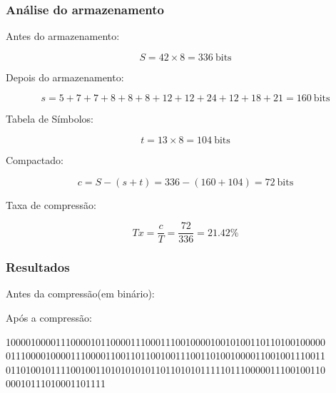 \documentclass[10pt]{beamer}
\begin{document}
\begin{frame}[t]
    \frametitle{Análise do armazenamento}
    Antes do armazenamento:

    $$S = 42\times 8 = 336\ \text{bits}$$

    \pause Depois do armazenamento:

    $$s=5+7+7+8+8+8+12+12+24+12+18+21 = 160\ \text{bits}$$

    \pause Tabela de Símbolos:

    $$t = 13\times 8 = 104\ \text{bits}$$

    \pause Compactado:

    $$c = S-(s+t) = 336-(160+104) = 72\ \text{bits}$$

    \pause Taxa de compressão:

    $$Tx = \frac{c}{T} = \frac{72}{336}=21.42\%$$


\end{frame}

\begin{frame}[t]
    \frametitle{Resultados}


    Antes da compressão(em binário):\vfill






    \vfill

    Após a compressão:\vfill

    1000010000111000010110000111000111001000010010100110110100100000
    0111000010000111000011001101100100111001101001000011001001110011
    0110100101111001001101010101011011010101111101110000011100100110
    00010111010001101111

\end{frame}
\end{document}
